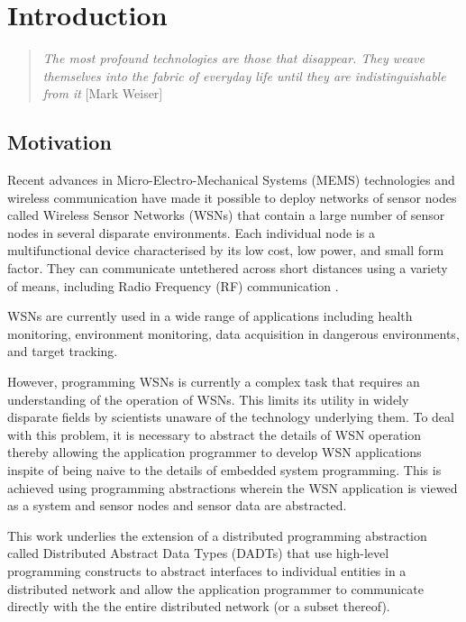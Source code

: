 \chapter{Introduction} \label{chap:Intro}

\begin{quote}
\emph{The most profound technologies are those that disappear. They weave
themselves into the fabric of everyday life until they are indistinguishable
from it} [Mark Weiser]
\end{quote}

\section{Motivation}
Recent advances in Micro-Electro-Mechanical Systems (MEMS)
technologies and wireless communication have made it possible to deploy networks
of sensor nodes called Wireless Sensor Networks (WSNs) that contain a large
number of sensor nodes in several disparate environments. Each individual node is
a multifunctional device characterised by its low cost, low power, and small form
factor. They can communicate untethered across short distances using a variety of
means, including Radio Frequency (RF) communication
\cite{SensorSurveyAkyildiz:2002}.

WSNs are currently used in a wide range of applications including health
monitoring, environment monitoring, data acquisition in dangerous environments,
and target tracking.

However, programming WSNs is currently a complex task that requires an
understanding of the operation of WSNs. This limits its utility in widely
disparate fields by scientists unaware of the technology underlying them. To deal
with this problem, it is necessary to abstract the details of WSN operation
thereby allowing the application programmer to develop WSN applications inspite
of being naive to the details of embedded system programming. This is achieved
using programming abstractions wherein the WSN application is viewed as a system
and sensor nodes and sensor data are abstracted.

This work underlies the extension of a distributed programming abstraction called
Distributed Abstract Data Types (DADTs) \cite{migliavacca_DADT:2006} that use
high-level programming constructs to abstract interfaces to individual entities
in a distributed network and allow the application programmer to communicate
directly with the the entire distributed network (or a subset thereof).

